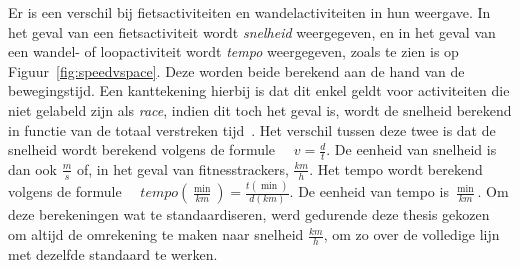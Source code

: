 Er is een verschil bij fietsactiviteiten en wandelactiviteiten in hun weergave.
In het geval van een fietsactiviteit wordt \textit{snelheid} weergegeven, en in
het geval van een wandel- of loopactiviteit wordt \textit{tempo} weergegeven,
zoals te zien is op Figuur~\ref{fig:speedvspace}. Deze worden beide berekend
aan de hand van de bewegingstijd. Een kanttekening hierbij is dat dit enkel
geldt voor activiteiten die niet gelabeld zijn als \textit{race}, indien dit
toch het geval is, wordt de snelheid berekend in functie van de totaal
verstreken tijd~\cite{MovingTi80:online}. Het verschil tussen deze twee is dat
de snelheid wordt berekend volgens de formule $ \quad v = \frac{d}{t}$. De
eenheid van snelheid is dan ook $\frac{m}{s}$ of, in het geval van
fitnesstrackers, $\frac{km}{h}$. Het tempo wordt berekend volgens de formule $
    \quad tempo(\frac{\min}{km}) = \frac{t(\min)}{d(km)}$. De eenheid van tempo is
$\frac{\min}{km}$. Om deze berekeningen wat te standaardiseren, werd gedurende
deze thesis gekozen om altijd de omrekening te maken naar snelheid
$\frac{km}{h}$, om zo over de volledige lijn met dezelfde standaard te werken.

